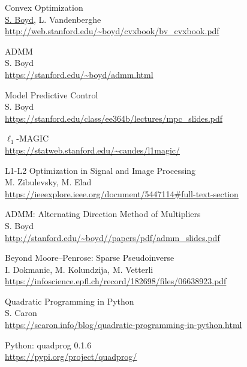 \documentclass{article}
\begin{document}
\clearpage
\cleardoublepage
{}
{} 
\begin{thebibliography}{1}

        Convex Optimization
        \\
        \href{https://web.stanford.edu/~boyd/}{S. Boyd}, L. Vandenberghe
        \\
        \url{ http://web.stanford.edu/~boyd/cvxbook/bv_cvxbook.pdf }

        ADMM
        \\
        S. Boyd
        \\
        \url{https://stanford.edu/~boyd/admm.html}

        Model Predictive Control
        \\
        S. Boyd
        \\
        \url{ https://stanford.edu/class/ee364b/lectures/mpc_slides.pdf }  

        $\ell_1$-MAGIC
        \\
        \url{ https://statweb.stanford.edu/~candes/l1magic/ }

        L1-L2 Optimization in Signal and Image Processing
        \\
        M. Zibulevsky, M. Elad
        \\
        \url{ https://ieeexplore.ieee.org/document/5447114#full-text-section }
    
        ADMM: Alternating Direction Method of Multipliers
        \\
        S. Boyd
        \\
        \url{ http://stanford.edu/~boyd//papers/pdf/admm_slides.pdf }
    
        Beyond Moore--Penrose: Sparse Pseudoinverse
        \\
        I. Dokmanic, M. Kolundzija, M. Vetterli
        \\
        \url{ https://infoscience.epfl.ch/record/182698/files/06638923.pdf }

        Quadratic Programming in Python
        \\
        S. Caron
        \\
        \url{ https://scaron.info/blog/quadratic-programming-in-python.html }
    
        Python: quadprog 0.1.6
        \\
        \url{ https://pypi.org/project/quadprog/ }
    

\end{thebibliography}
\end{document}
